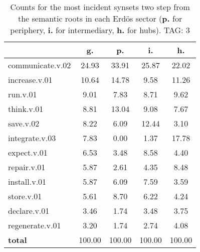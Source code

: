 \begin{table}[h!]
\begin{center}
\begin{tabular}{| l | c | c | c | c |}\hline
 & g. & p. & i. & h. \\\hline
communicate.v.02 & 24.93  & 33.91  & 25.87  & 22.02 \\\hline
increase.v.01 & 10.64  & 14.78  & 9.58  & 11.26 \\\hline
run.v.01 & 9.01  & 7.83  & 8.71  & 9.62 \\\hline
think.v.01 & 8.81  & 13.04  & 9.08  & 7.67 \\\hline
save.v.02 & 8.22  & 6.09  & 12.44  & 3.10 \\\hline
integrate.v.03 & 7.83  & 0.00  & 1.37  & 17.78 \\\hline
expect.v.01 & 6.53  & 3.48  & 8.58  & 4.40 \\\hline
repair.v.01 & 5.87  & 2.61  & 4.35  & 8.48 \\\hline
install.v.01 & 5.87  & 6.09  & 7.59  & 3.59 \\\hline
store.v.01 & 5.61  & 8.70  & 6.22  & 4.24 \\\hline
declare.v.01 & 3.46  & 1.74  & 3.48  & 3.75 \\\hline
regenerate.v.01 & 3.20  & 1.74  & 2.74  & 4.08 \\\hline
{{\bf total}} & 100.00  & 100.00  & 100.00  & 100.00 \\\hline
\end{tabular}
\caption{Counts for the most incident synsets two step from the semantic roots in each Erd\"os sector ({\bf p.} for periphery, {\bf i.} for intermediary, {\bf h.} for hubs). TAG: 3}
\end{center}
\end{table}